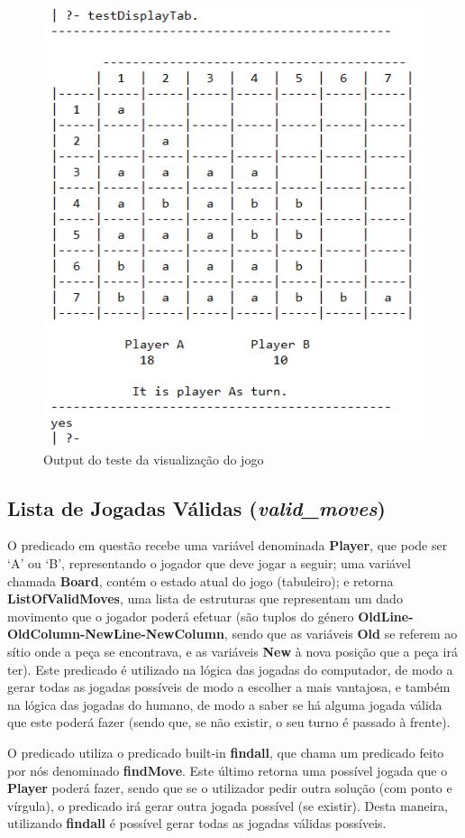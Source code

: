 \documentclass[a4paper]{article}
\begin{document}
\begin{figure}[hbp!]
    \centering
    \includegraphics[width=.65\linewidth]{others/test-tabuleiro.png}
    \caption{Output do teste da visualização do jogo}
    \label{fig}
\end{figure}

\newpage\subsection{Lista de Jogadas Válidas (\textit{valid\_moves})}

\bigskip
O predicado em questão recebe uma variável denominada \textbf{Player}, que pode ser ‘A’ ou ‘B’, representando o jogador que deve jogar a seguir; uma variável chamada \textbf{Board}, contém o estado atual do jogo (tabuleiro); e retorna \textbf{ListOfValidMoves}, uma lista de estruturas que representam um dado movimento que o jogador poderá efetuar (são tuplos do género \textbf{OldLine-OldColumn-NewLine-NewColumn}, sendo que as variáveis \textbf{Old} se referem ao sítio onde a peça se encontrava, e as variáveis \textbf{New} à nova posição que a peça irá ter). Este predicado é utilizado na lógica das jogadas do computador, de modo a gerar todas as jogadas possíveis de modo a escolher a mais vantajosa, e também na lógica das jogadas do humano, de modo a saber se há alguma jogada válida que este poderá fazer (sendo que, se não existir, o seu turno é passado à frente).

\bigskip
O predicado utiliza o predicado built-in \textbf{findall}, que chama um predicado feito por nós denominado \textbf{findMove}. Este último retorna uma possível jogada que o \textbf{Player} poderá fazer, sendo que se o utilizador pedir outra solução (com ponto e vírgula), o predicado irá gerar outra jogada possível (se existir). Desta maneira, utilizando \textbf{findall} é possível gerar todas as jogadas válidas possíveis.
\end{document}
